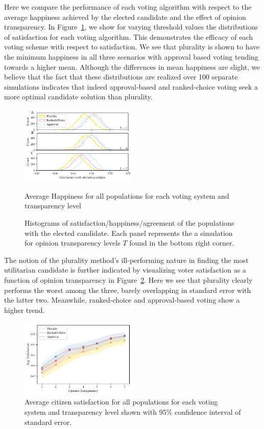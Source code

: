 Here we compare the performance of each voting algorithm with respect to the average happiness achieved by the elected candidate and 
the effect of opinion transparency. \newline
\indent In Figure~\ref{fig:satisfaction_hists}, we show for varying threshold values the distributions of satisfaction for each
voting algorithm. This demonstrates the efficacy of each voting scheme with respect to satisfaction. We see that plurality
is shown to have the minimum happiness in all three scenarios with approval based voting tending towards a higher mean.
Although the differences in mean happiness are slight, we believe that the fact that these distributions are realized over
100 separate simulations indicates that indeed approval-based and ranked-choice voting seek a more optimal candidate solution
than plurality.
\begin{figure}[h!]
\includegraphics[width=0.5\textwidth]{figs/satisfaction_hists.pdf}
\caption{Average Happiness for all populations for each voting system and transparency level}
\label{fig:satisfaction_hists}
    \caption{Histograms of satisfaction/happiness/agreement of the populations with the elected
    candidate. Each panel represents the a simulation for opinion transparency levels $T$ found
    in the bottom right corner. }
\end{figure}
The notion of the plurality method's ill-performing nature in finding the most utilitarian candidate 
is further indicated by visualizing voter satisfaction as a function of opinion transparency in Figure~\ref{fig:avghapp_by_transparency}.
Here we see that plurality clearly performs the worst among the three, barely overlapping in standard error with the latter two.
Meanwhile, ranked-choice and approval-based voting show a higher trend. 
\begin{figure}[h!]
\includegraphics[width=0.5\textwidth]{figs/avghapp_transparency.pdf}
\caption{Average citizen satisfaction for all populations for each voting system and transparency level shown
    with 95\% confidence interval of standard error.}
\label{fig:avghapp_by_transparency}
\end{figure}

